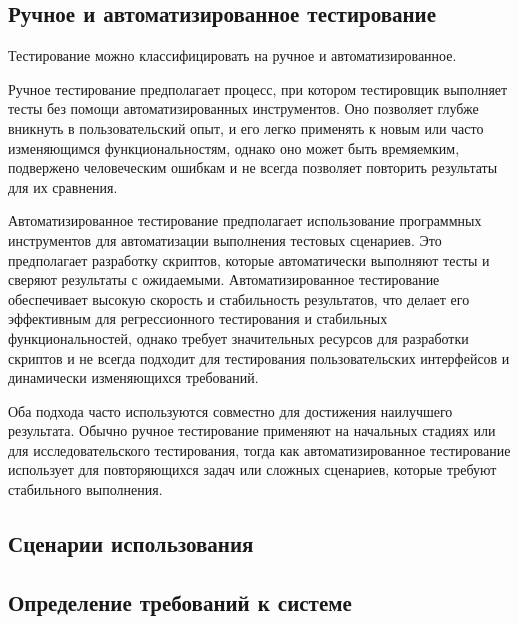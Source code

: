 \subsection{Ручное и автоматизированное тестирование}

Тестирование можно классифицировать на ручное и автоматизированное.

Ручное тестирование предполагает процесс, при котором тестировщик выполняет тесты без помощи автоматизированных инструментов.
Оно позволяет глубже вникнуть в пользовательский опыт, и его легко применять к новым или часто изменяющимся функциональностям, однако оно может быть времяемким, подвержено человеческим ошибкам и не всегда позволяет повторить результаты для их сравнения.

Автоматизированное тестирование предполагает использование программных инструментов для автоматизации выполнения тестовых сценариев. Это предполагает разработку скриптов, которые автоматически выполняют тесты и сверяют результаты с ожидаемыми.
Автоматизированное тестирование обеспечивает высокую скорость и стабильность результатов, что делает его эффективным для регрессионного тестирования и стабильных функциональностей, однако требует значительных ресурсов для разработки скриптов и не всегда подходит для тестирования пользовательских интерфейсов и динамически изменяющихся требований.

Оба подхода часто используются совместно для достижения наилучшего результата. Обычно ручное тестирование применяют на начальных стадиях или для исследовательского тестирования, тогда как автоматизированное тестирование использует для повторяющихся задач или сложных сценариев, которые требуют стабильного выполнения.

\subsection{Сценарии использования}

\subsection{Определение требований к системе}
